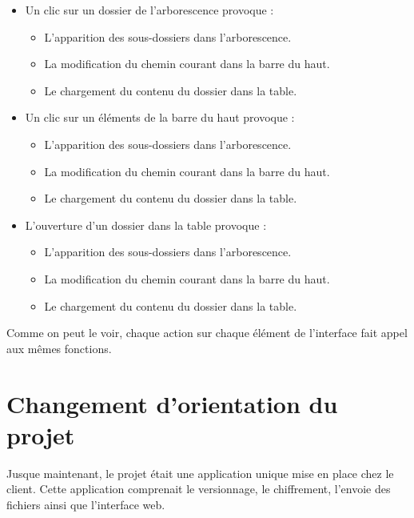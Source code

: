 \begin{itemize}
     \item Un clic sur un dossier de l'arborescence provoque :

     \begin{itemize}
          \item L'apparition des sous-dossiers dans l'arborescence.
          \item La modification du chemin courant dans la barre du haut.
          \item Le chargement du contenu du dossier dans la table.
     \end{itemize}

     \item Un clic sur un éléments de la barre du haut provoque :

     \begin{itemize}
          \item L'apparition des sous-dossiers dans l'arborescence.
          \item La modification du chemin courant dans la barre du haut.
          \item Le chargement du contenu du dossier dans la table.
     \end{itemize}

     \item L'ouverture d'un dossier dans la table provoque :

     \begin{itemize}
          \item L'apparition des sous-dossiers dans l'arborescence.
          \item La modification du chemin courant dans la barre du haut.
          \item Le chargement du contenu du dossier dans la table.
     \end{itemize}
\end{itemize}

Comme on peut le voir, chaque action sur chaque élément de l'interface fait appel aux mêmes fonctions.

\section{Changement d'orientation du projet}

Jusque maintenant, le projet était une application unique mise en place chez le client.
Cette application comprenait le versionnage, le chiffrement, l'envoie des fichiers ainsi
que l'interface web.

